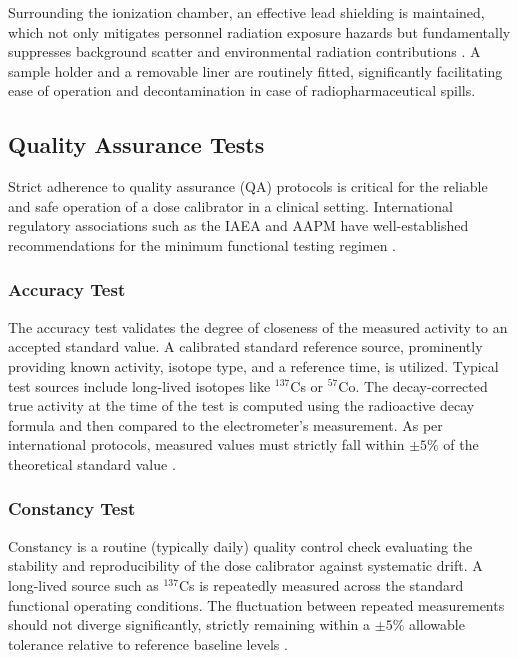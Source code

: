 Surrounding the ionization chamber, an effective lead shielding is maintained, which not only mitigates personnel radiation exposure hazards but fundamentally suppresses background scatter and environmental radiation contributions \cite{cherry2012physics}. A sample holder and a removable liner are routinely fitted, significantly facilitating ease of operation and decontamination in case of radiopharmaceutical spills.

\subsection{Quality Assurance Tests}
Strict adherence to quality assurance (QA) protocols is critical for the reliable and safe operation of a dose calibrator in a clinical setting. International regulatory associations such as the IAEA and AAPM have well-established recommendations for the minimum functional testing regimen \cite{iaea_qa_nm, aapm181}.

\subsubsection{Accuracy Test}
The accuracy test validates the degree of closeness of the measured activity to an accepted standard value. A calibrated standard reference source, prominently providing known activity, isotope type, and a reference time, is utilized. Typical test sources include long-lived isotopes like $^{137}$Cs or $^{57}$Co. The decay-corrected true activity at the time of the test is computed using the radioactive decay formula and then compared to the electrometer's measurement. As per international protocols, measured values must strictly fall within $\pm 5\%$ of the theoretical standard value \cite{iaea_qa_nm, aapm181}.

\subsubsection{Constancy Test}
Constancy is a routine (typically daily) quality control check evaluating the stability and reproducibility of the dose calibrator against systematic drift. A long-lived source such as $^{137}$Cs is repeatedly measured across the standard functional operating conditions. The fluctuation between repeated measurements should not diverge significantly, strictly remaining within a $\pm 5\%$ allowable tolerance relative to reference baseline levels \cite{iaea_qa_nm}.

